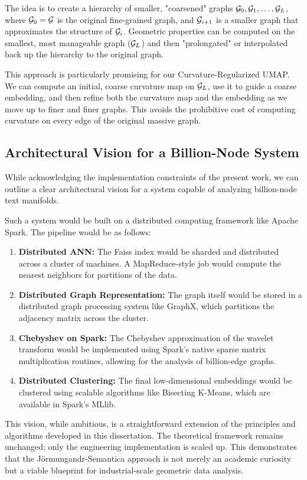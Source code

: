 The idea is to create a hierarchy of smaller, "coarsened" graphs $\mathcal{G}_0, \mathcal{G}_1, \dots, \mathcal{G}_L$, where $\mathcal{G}_0 = \mathcal{G}$ is the original fine-grained graph, and $\mathcal{G}_{i+1}$ is a smaller graph that approximates the structure of $\mathcal{G}_i$. Geometric properties can be computed on the smallest, most manageable graph ($\mathcal{G}_L$) and then "prolongated" or interpolated back up the hierarchy to the original graph.

This approach is particularly promising for our Curvature-Regularized UMAP. We can compute an initial, coarse curvature map on $\mathcal{G}_L$, use it to guide a coarse embedding, and then refine both the curvature map and the embedding as we move up to finer and finer graphs. This avoids the prohibitive cost of computing curvature on every edge of the original massive graph.

\subsection{Architectural Vision for a Billion-Node System}
While acknowledging the implementation constraints of the present work, we can outline a clear architectural vision for a system capable of analyzing billion-node text manifolds.

Such a system would be built on a distributed computing framework like Apache Spark. The pipeline would be as follows:
\begin{enumerate}
    \item \textbf{Distributed ANN:} The Faiss index would be sharded and distributed across a cluster of machines. A MapReduce-style job would compute the nearest neighbors for partitions of the data.
    \item \textbf{Distributed Graph Representation:} The graph itself would be stored in a distributed graph processing system like GraphX, which partitions the adjacency matrix across the cluster.
    \item \textbf{Chebyshev on Spark:} The Chebyshev approximation of the wavelet transform would be implemented using Spark's native sparse matrix multiplication routines, allowing for the analysis of billion-edge graphs.
    \item \textbf{Distributed Clustering:} The final low-dimensional embeddings would be clustered using scalable algorithms like Bisecting K-Means, which are available in Spark's MLlib.
\end{enumerate}

This vision, while ambitious, is a straightforward extension of the principles and algorithms developed in this dissertation. The theoretical framework remains unchanged; only the engineering implementation is scaled up. This demonstrates that the Jörmungandr-Semantica approach is not merely an academic curiosity but a viable blueprint for industrial-scale geometric data analysis.